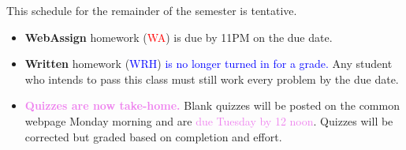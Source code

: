 \documentclass[11pt]{article}
\begin{document}
\thispagestyle{fancy}


\begin{center} This schedule for the remainder of the semester is tentative. \end{center}


\begin{itemize}
\item \textbf{WebAssign} homework (\textcolor{red}{WA}) is due by 11PM on the due date. 
\item \textbf{Written} homework (\textcolor{blue}{WRH}) \textcolor{blue}{is no longer turned in for a grade.} Any student who intends to pass this class must still work every problem by the due date.
\item \textcolor{violet}{\textbf{Quizzes are now take-home.} }Blank quizzes will be posted on the common webpage Monday morning and are \textcolor{violet}{due Tuesday by 12 noon}. Quizzes will be corrected but graded based on completion and effort.\end{itemize}
\end{document}
